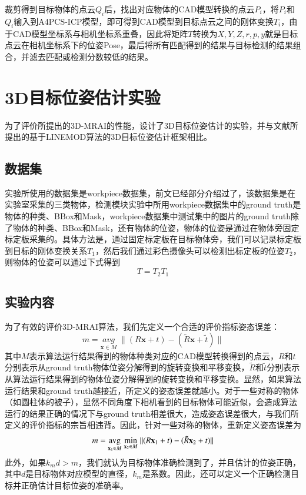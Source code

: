 裁剪得到目标物体的点云$Q_i$后，找出对应物体的CAD模型转换的点云$P_i$，将$P_i$和$Q_i$输入到A4PCS-ICP模型，即可得到CAD模型到目标点云之间的刚体变换$T_i$，由于CAD模型坐标系与相机坐标系重叠，因此将矩阵$T$转换为$X,Y,Z,r,p,y$就是目标点云在相机坐标系下的位姿Pose，最后将所有匹配得到的结果与目标检测的结果组合，并滤去匹配或检测分数较低的结果。

\section{3D目标位姿估计实验}
为了评价所提出的3D-MRAI的性能，设计了3D目标位姿估计的实验，并与文献\cite{hinterstoisser2012model}所提出的基于LINEMOD算法的3D目标位姿估计框架相比。
\subsection{数据集}
实验所使用的数据集是workpiece数据集，前文已经部分介绍过了，该数据集是在实验室采集的三类物体，检测模块实验中所用workpiece数据集中的ground truth是物体的种类、BBox和Mask，workpiece数据集中测试集中的图片的ground truth除了物体的种类、BBox和Mask，还有物体的位姿，物体的位姿是通过在物体旁固定标定板采集的。具体方法是，通过固定标定板在目标物体旁，我们可以记录标定板到目标的刚体变换关系$T_1$，然后我们通过彩色摄像头可以检测出标定板的位姿$T_2$，则物体的位姿可以通过下式得到
\begin{equation}
  T = T_2T_1
\end{equation}

\subsection{实验内容}
为了有效的评价3D-MRAI算法，我们先定义一个合适的评价指标{\kai 姿态误差}：
\begin{equation}
  m = {\underset{\mathbf{x}\in M}{avg}} \; {\parallel (R\mathbf{x}+t) - (\tilde{R}\mathbf{x}+\tilde{t})\parallel}
\end{equation}
其中$M$表示算法运行结果得到的物体种类对应的CAD模型转换得到的点云，$R$和$t$分别表示从ground truth物体位姿分解得到的旋转变换和平移变换，$\tilde{R}$和$\tilde{t}$分别表示从算法运行结果得到的物体位姿分解得到的旋转变换和平移变换。显然，如果算法运行结果和ground truth越接近，所定义的姿态误差就越小。对于一些对称的物体（如圆柱体的被子），显然不同角度下相机看到的目标物体可能近似，会造成算法运行的结果正确的情况下与ground truth相差很大，造成姿态误差很大，与我们所定义的评价指标的宗旨相违背。因此，针对一些对称的物体，重新定义姿态误差为
\begin{equation}
  m = {\operatorname*{avg}_{\mathbf{x}_1\in M}} \; {\min_{\mathbf{x}_2\in M}} \; \lVert(R\mathbf{x}_1+t) - (\tilde{R}\mathbf{x}_2+t)\rVert
\end{equation}
此外，如果$k_md>m$，我们就认为目标物体准确检测到了，并且估计的位姿正确，其中$d$是目标物体对应模型的直径，$k_m$是系数。因此，还可以定义一个正确检测目标并正确估计目标位姿的准确率。

